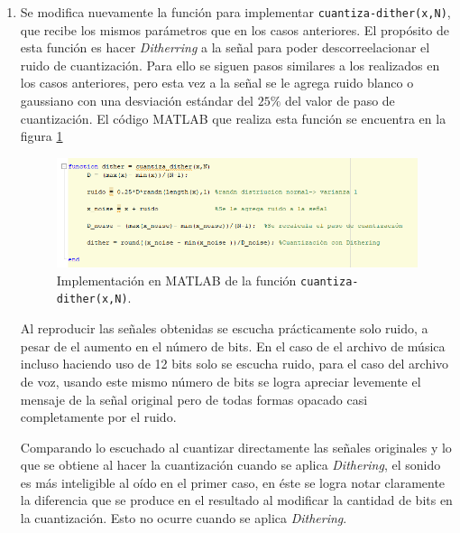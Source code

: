 \begin{enumerate}
\begin{enumerate}
    
    
  \end{enumerate}
  
  
  \item Se modifica nuevamente la función para implementar \texttt{cuantiza-dither(x,N)}, que recibe los mismos parámetros que en los casos anteriores. El propósito de esta función es hacer \textit{Ditherring} a la señal para poder descorreelacionar el ruido de cuantización. Para ello se siguen pasos similares a los realizados en los casos anteriores, pero esta vez a la señal se le agrega ruido blanco o gaussiano con una desviación estándar del $25\%$ del valor de paso de cuantización. El código MATLAB que realiza esta función se encuentra en la figura \ref{dither} 
  
  
  \begin{figure}[H]
      \centering
      \includegraphics[scale = 0.5]{imagenes2/dither.png}
      \caption{Implementación en MATLAB de la función  \texttt{cuantiza-dither(x,N)}.}
      \label{dither}
  \end{figure}
  
  Al reproducir las señales obtenidas se escucha prácticamente solo ruido, a pesar de el aumento en el número de bits. En el caso de el archivo de música incluso haciendo uso de 12 bits solo se escucha ruido, para el caso del archivo de voz, usando este mismo número de bits se logra apreciar levemente el mensaje de la señal original pero de todas formas opacado casi completamente por el ruido.
  
  Comparando lo escuchado al cuantizar directamente las señales originales y lo que se obtiene al hacer la cuantización cuando se aplica \textit{Dithering}, el sonido es más inteligible al oído en el primer caso, en éste se logra notar claramente la diferencia que se produce en el resultado al modificar la cantidad de bits en la cuantización. Esto no ocurre cuando se aplica \textit{Dithering}.
  
  
    
\end{enumerate}
